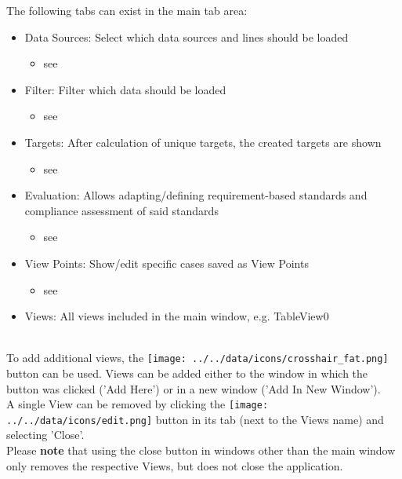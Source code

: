 The following tabs can exist in the main tab area:
\begin{itemize}
 \item Data Sources: Select which data sources and lines should be loaded
  \begin{itemize}
 \item see 
 \end{itemize}
 \item Filter: Filter which data should be loaded
   \begin{itemize}
 \item see 
 \end{itemize}
  \item Targets: After calculation of unique targets, the created targets are shown
 \begin{itemize}
 \item see 
 \end{itemize}
 \item Evaluation: Allows adapting/defining requirement-based standards and compliance assessment of said standards
 \begin{itemize}
 \item see 
 \end{itemize}
 \item View Points: Show/edit specific cases saved as View Points
  \begin{itemize}
 \item see 
 \end{itemize}
 \item Views: All views included in the main window, e.g. TableView0
\end{itemize}
\  \\

To add additional views, the \texttt{[image: ../../data/icons/crosshair\_fat.png]} button can be used. 
Views can be added either to the window in which the button was clicked ('Add Here') or in a new window ('Add In New Window'). \\

A single View can be removed by clicking the \texttt{[image: ../../data/icons/edit.png]} button in its tab (next to the Views name) and selecting 'Close'. \\

Please \textbf{note} that using the close button in windows other than the main window only removes the respective Views, but does not close the application.

